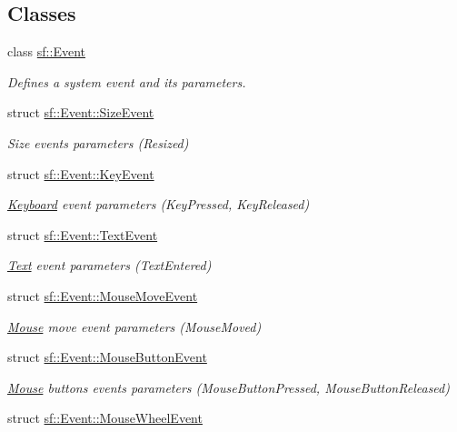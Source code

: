 \subsection*{Classes}
\begin{DoxyCompactItemize}
\item 
class \hyperlink{classsf_1_1_event}{sf\-::\-Event}
\begin{DoxyCompactList}\small\item\em Defines a system event and its parameters. \end{DoxyCompactList}\item 
struct \hyperlink{structsf_1_1_event_1_1_size_event}{sf\-::\-Event\-::\-Size\-Event}
\begin{DoxyCompactList}\small\item\em Size events parameters (Resized) \end{DoxyCompactList}\item 
struct \hyperlink{structsf_1_1_event_1_1_key_event}{sf\-::\-Event\-::\-Key\-Event}
\begin{DoxyCompactList}\small\item\em \hyperlink{classsf_1_1_keyboard}{Keyboard} event parameters (Key\-Pressed, Key\-Released) \end{DoxyCompactList}\item 
struct \hyperlink{structsf_1_1_event_1_1_text_event}{sf\-::\-Event\-::\-Text\-Event}
\begin{DoxyCompactList}\small\item\em \hyperlink{classsf_1_1_text}{Text} event parameters (Text\-Entered) \end{DoxyCompactList}\item 
struct \hyperlink{structsf_1_1_event_1_1_mouse_move_event}{sf\-::\-Event\-::\-Mouse\-Move\-Event}
\begin{DoxyCompactList}\small\item\em \hyperlink{classsf_1_1_mouse}{Mouse} move event parameters (Mouse\-Moved) \end{DoxyCompactList}\item 
struct \hyperlink{structsf_1_1_event_1_1_mouse_button_event}{sf\-::\-Event\-::\-Mouse\-Button\-Event}
\begin{DoxyCompactList}\small\item\em \hyperlink{classsf_1_1_mouse}{Mouse} buttons events parameters (Mouse\-Button\-Pressed, Mouse\-Button\-Released) \end{DoxyCompactList}\item 
struct \hyperlink{structsf_1_1_event_1_1_mouse_wheel_event}{sf\-::\-Event\-::\-Mouse\-Wheel\-Event}

\end{DoxyCompactItemize}
